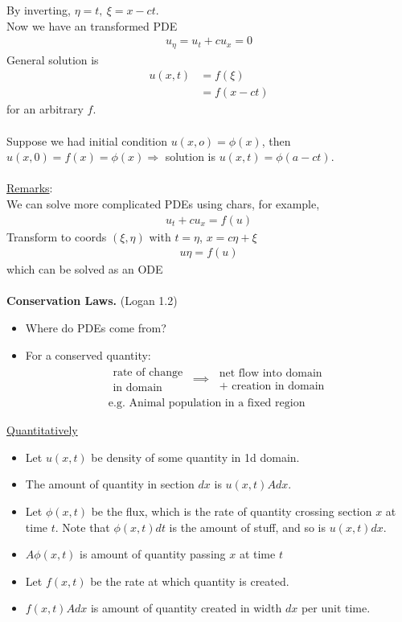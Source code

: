 \documentclass[12pt, letterpaper]{article}
\begin{document}
By inverting, $\eta = t,\ \xi = x - ct$. \\
Now we have an transformed PDE
\begin{align*}
    u_\eta= u_t + cu_x = 0
\end{align*}
General solution is 
\begin{align*}
    u(x,t) &= f(\xi) \\
    &= f(x-ct) 
\end{align*}
for an arbitrary $f$. \\ \\
Suppose we had initial condition $u(x,o) = \phi (x)$, then $u(x,0) = f(x) = \phi(x) \Rightarrow$
solution is $u(x,t) = \phi(a-ct)$. \\ \\
\underline{Remarks}: \\
We can solve more complicated PDEs using chars, for example,
\begin{align*}
    u_t + cu_x = f(u)
\end{align*}
Transform to coords $(\xi,\eta)$ with $t = \eta$, $x = c\eta + \xi$
\begin{align*}
    u\eta = f(u)
\end{align*}
which can be solved as an ODE \\ \\
\textbf{Conservation Laws.} (Logan 1.2)
\begin{itemize}
    \item Where do PDEs come from?
    \item For a conserved quantity:
    \begin{align*}
        \begin{matrix}
            \text{rate of change} \\ \text{in domain}
        \end{matrix}\ \implies\
        \begin{matrix}
            \text{net flow into domain} \\ \text{+ creation in domain}
        \end{matrix} \\
        \text{e.g. Animal population in a fixed region} 
    \end{align*}
\end{itemize}
\underline{Quantitatively}
\begin{itemize}
    \item Let $u(x,t)$ be density of some quantity in 1d domain.
    \item The amount of quantity in section $dx$ is $u(x,t)Adx$.
    \item Let $\phi(x,t)$ be the flux, which is the rate of quantity crossing 
    section $x$ at time $t$. Note that $\phi(x,t) dt$ is the amount of stuff, 
    and so is $u(x,t)dx$.
    \item $A\phi(x,t)$ is amount of quantity passing $x$ at time $t$
    \item Let $f(x,t)$ be the rate at which quantity is created.
    \item $f(x,t)Adx$ is amount of quantity created in width $dx$ per unit time.
\end{itemize}
\end{document}
